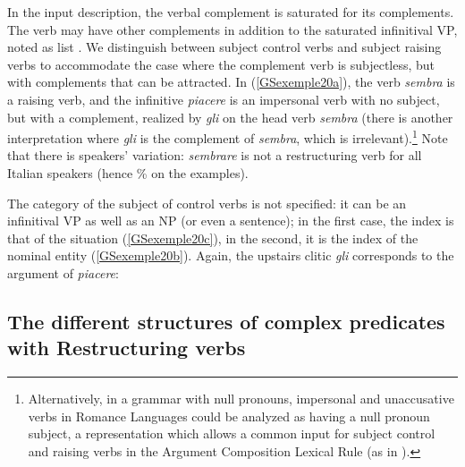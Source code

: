 \documentclass[output=paper
                ,modfonts
                ,nonflat
	        ,collection
	        ,collectionchapter
	        ,collectiontoclongg
 	        ,biblatex
                ,babelshorthands
                ,newtxmath
                ,draftmode
                ,colorlinks, citecolor=brown
]{./langsci/langscibook}
\begin{document}
{In the input description, the verbal complement is saturated for its complements. The verb may have other complements in addition to the saturated infinitival VP, noted as list . We distinguish between subject control verbs and subject raising verbs to accommodate the case where the complement verb is subjectless, but with complements that can be attracted. In (\ref{GSexemple20a}), the verb \emph{sembra} is a raising verb, and the infinitive \emph{piacere} is an impersonal verb with no subject, but with a complement, realized by \emph{gli} on the head verb \emph{sembra} (there is another interpretation where \emph{gli} is the complement of \emph{sembra}, which is irrelevant).\footnote{Alternatively, in a grammar with null pronouns, impersonal and unaccusative verbs in Romance Languages could be analyzed as having a null pronoun subject, a representation which allows a common input for subject control and raising verbs in the Argument Composition Lexical Rule (as in \citealt{Monachesi98a}).} Note that there is speakers' variation: \emph{sembrare} is not a restructuring verb for all Italian speakers (hence \% on the examples).   

The category of the subject of control verbs is not specified: it can be an infinitival VP as well as an NP (or even a sentence); in the first case, the index is that of the situation (\ref{GSexemple20c}), in the second, it is the index of the nominal entity (\ref{GSexemple20b}). Again, the upstairs clitic \emph{gli} corresponds to the argument of \emph{piacere}:

\eal
	\label{GSexemple20}
    \label{GSexemple20a}

	\label{GSexemple20b}		
		
	\label{GSexemple20c}	
\zl

\subsection{The different structures of complex predicates with Restructuring verbs} \label{GSsection3.2}

}
\end{document}
